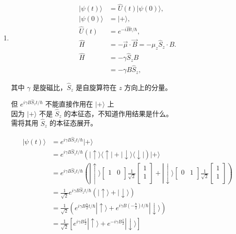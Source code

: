 \documentclass[lang=cn,15pt]{elegantbook}
\begin{document}
\begin{solution}
	\begin{enumerate}
		\item \begin{align*}
		|\psi(t)\rangle &= \hat{U}(t) |\psi(0)\rangle, \\
		|\psi(0)\rangle &= |+\rangle, \\
		\hat{U}(t) &= e^{-i \hat{H} t / \hbar}, \\
		\hat{H} &= -\vec{\mu} \cdot \vec{B} = -\mu_z \hat{S}_z \cdot B.\\
		\hat{H} &= -\gamma \hat{S}_z B \\
		&= -\gamma B \hat{S}_z,
		\end{align*}
		
		其中 $\gamma$ 是旋磁比，$\hat{S}_z$ 是自旋算符在 $z$ 方向上的分量。
		
		但 $e^{i \gamma B \hat{S}_z t / \hbar}$ 不能直接作用在 $|+\rangle$ 上 \\
		因为 $|+\rangle$ 不是 $\hat{S}_z$ 的本征态，不知道作用结果是什么。 \\
		需将其用 $\hat{S}_z$ 的本征态展开。
		
		\begin{align*}
			|\psi(t)\rangle &= e^{i \gamma B \hat{S}_z t / \hbar} |+\rangle \\
			&= e^{i \gamma B \hat{S}_z t / \hbar} (| \uparrow \rangle \langle \uparrow | + | \downarrow \rangle \langle \downarrow |) |+\rangle \\
			&= e^{i\gamma B\hat{S}_zt/\hbar}\left( |\uparrow \rangle \left[ \begin{matrix}
				1&		0\\
			\end{matrix} \right] \frac{1}{\sqrt{2}}\left[ \begin{array}{c}
				1\\
				1\\
			\end{array} \right] +|\downarrow \rangle \left[ \begin{matrix}
				0&		1\\
			\end{matrix} \right] \frac{1}{\sqrt{2}}\left[ \begin{array}{c}
				1\\
				1\\
			\end{array} \right] \right)  \\
			&= \frac{1}{\sqrt{2}} e^{i \gamma B \hat{S}_z t / \hbar} (| \uparrow \rangle + | \downarrow \rangle) \\
			&= \frac{1}{\sqrt{2}} \left( e^{i \gamma B \frac{\hbar}{2} t / \hbar} | \uparrow \rangle + e^{i \gamma B \left(-\frac{\hbar}{2}\right) t / \hbar} | \downarrow \rangle \right) \\
			&= \frac{1}{\sqrt{2}} \left[ e^{i \gamma B \frac{t}{2}} | \uparrow \rangle + e^{-i \gamma B \frac{t}{2}} | \downarrow \rangle \right]
		\end{align*}
		

\end{enumerate}
\end{solution}
\end{document}
